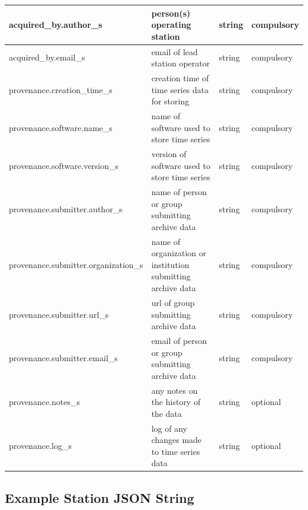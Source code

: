 \documentclass{article}
\begin{document}
\begin{table}[htb!]
\begin{tabular}{|l|p{3in}|l|l|}
		acquired\_by.author\_s & person(s) operating station & string & compulsory \\ \hline
		acquired\_by.email\_s & email of lead station operator & string & compulsory \\ \hline
		provenance.creation\_time\_s & creation time of time series data for storing & string & compulsory \\ \hline
		provenance.software.name\_s & name of software used to store time series & string & compulsory \\ \hline
		provenance.software.version\_s & version of software used to store time series & string & compulsory \\ \hline
		provenance.submitter.author\_s & name of person or group submitting archive data & string & compulsory \\ \hline
		provenance.submitter.organization\_s & name of organization or institution submitting archive data & string & compulsory \\ \hline
		provenance.submitter.url\_s & url of group submitting archive data & string & compulsory \\ \hline
		provenance.submitter.email\_s & email of person or group submitting archive data & string & compulsory  \\ \hline
		provenance.notes\_s & any notes on the history of the data & string & optional \\ \hline
		provenance.log\_s & log of any changes made to time series data & string & optional \\ \hline
	\end{tabular}
\label{tab:station01}
\end{table}	
   
\newpage
\subsection{Example Station JSON String}
\end{document}
